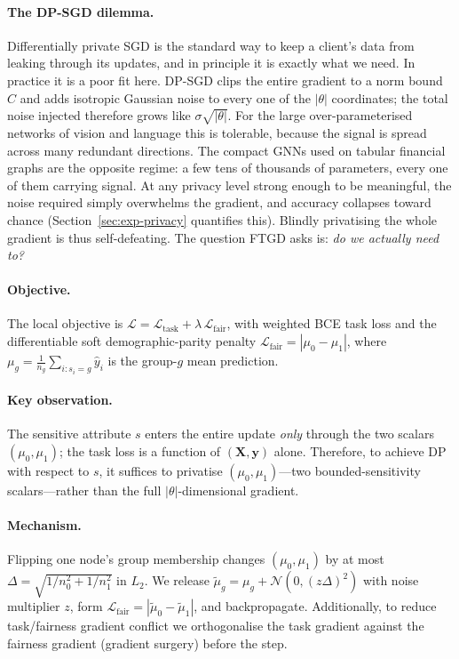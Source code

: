 \documentclass[pdflatex,sn-mathphys-num]{sn-jnl}
\theoremstyle{thmstyleone}%
\theoremstyle{thmstyletwo}%
\theoremstyle{thmstylethree}%
\begin{document}
\paragraph{The DP-SGD dilemma.}
Differentially private SGD is the standard way to keep a client's data from
leaking through its updates, and in principle it is exactly what we need. In
practice it is a poor fit here. DP-SGD clips the entire gradient to a norm bound
$C$ and adds isotropic Gaussian noise to every one of the $|\theta|$
coordinates; the total noise injected therefore grows like $\sigma\sqrt{|\theta|}$.
For the large over-parameterised networks of vision and language this is
tolerable, because the signal is spread across many redundant directions. The
compact GNNs used on tabular financial graphs are the opposite regime: a few
tens of thousands of parameters, every one of them carrying signal. At any
privacy level strong enough to be meaningful, the noise required simply
overwhelms the gradient, and accuracy collapses toward chance
(Section~\ref{sec:exp-privacy} quantifies this). Blindly privatising the whole
gradient is thus self-defeating. The question FTGD asks is: \emph{do we actually
need to?}

\paragraph{Objective.}
The local objective is $\mathcal{L}=\mathcal{L}_{\text{task}}+\lambda\,
\mathcal{L}_{\text{fair}}$, with weighted BCE task loss and the differentiable
soft demographic-parity penalty
$\mathcal{L}_{\text{fair}}=|\mu_0-\mu_1|$, where
$\mu_g=\frac{1}{n_g}\sum_{i:s_i=g}\hat{y}_i$ is the group-$g$ mean prediction.

\paragraph{Key observation.}
The sensitive attribute $s$ enters the entire update \emph{only} through the two
scalars $(\mu_0,\mu_1)$; the task loss is a function of $(\mathbf{X},\mathbf{y})$
alone. Therefore, to achieve DP with respect to $s$, it suffices to privatise
$(\mu_0,\mu_1)$---two bounded-sensitivity scalars---rather than the full
$|\theta|$-dimensional gradient.

\paragraph{Mechanism.}
Flipping one node's group membership changes $(\mu_0,\mu_1)$ by at most
$\Delta=\sqrt{1/n_0^2+1/n_1^2}$ in $L_2$. We release
$\tilde{\mu}_g=\mu_g+\mathcal{N}(0,(z\Delta)^2)$ with noise multiplier $z$, form
$\mathcal{L}_{\text{fair}}=|\tilde{\mu}_0-\tilde{\mu}_1|$, and backpropagate.
Additionally, to reduce task/fairness gradient conflict we orthogonalise the
task gradient against the fairness gradient (gradient surgery) before the step.
\end{document}
